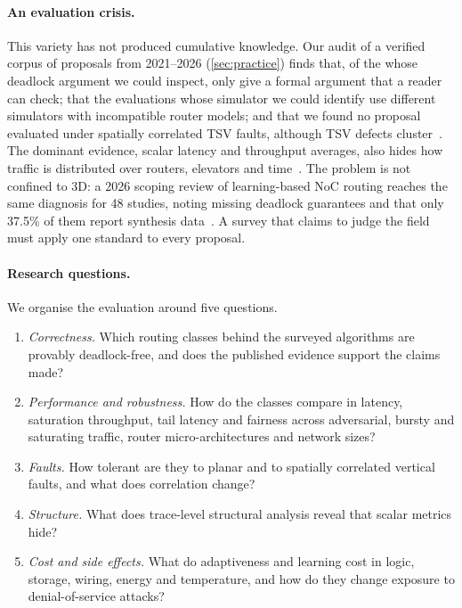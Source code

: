 \paragraph{An evaluation crisis.} This variety has not produced cumulative knowledge. Our audit of a verified corpus of  proposals from 2021--2026 (\cref{sec:practice}) finds that, of the  whose deadlock argument we could inspect, only  give a formal argument that a reader can check; that the  evaluations whose simulator we could identify use  different simulators with incompatible router models; and that we found no proposal evaluated under spatially correlated TSV faults, although TSV defects cluster~\cite{dang2021hotcluster,wang2015clustering}. The dominant evidence, scalar latency and throughput averages, also hides how traffic is distributed over routers, elevators and time~\cite{mesellem2026era}. The problem is not confined to 3D: a 2026 scoping review of learning-based NoC routing reaches the same diagnosis for 48 studies, noting missing deadlock guarantees and that only 37.5\% of them report synthesis data~\cite{ibarra2026learning}. A survey that claims to judge the field must apply one standard to every proposal.

\paragraph{Research questions.} We organise the evaluation around five questions.
\begin{enumerate}[label=\RQ{\arabic*},leftmargin=*,itemsep=1pt]
  \item \emph{Correctness.} Which routing classes behind the surveyed algorithms are provably deadlock-free, and does the published evidence support the claims made?
  \item \emph{Performance and robustness.} How do the classes compare in latency, saturation throughput, tail latency and fairness across adversarial, bursty and saturating traffic, router micro-architectures and network sizes?
  \item \emph{Faults.} How tolerant are they to planar and to spatially correlated vertical faults, and what does correlation change?
  \item \emph{Structure.} What does trace-level structural analysis reveal that scalar metrics hide?
  \item \emph{Cost and side effects.} What do adaptiveness and learning cost in logic, storage, wiring, energy and temperature, and how do they change exposure to denial-of-service attacks?
\end{enumerate}


